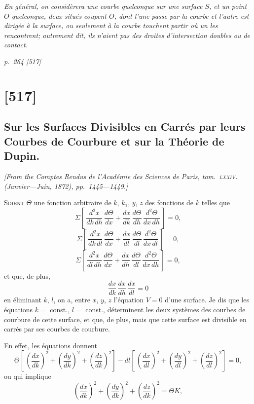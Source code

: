 \documentclass[11pt,a4paper]{article}
\theoremstyle{plain}
\theoremstyle{definition}
\begin{document}
\bigskip
\textit{En g\'en\'eral, on consid\`erera une courbe quelconque sur une surface $S$, et un point $O$ quelconque,
deux situ\'es coupent $O$, dont l'une passe par la courbe et l'autre est dirig\'ee \`a la surface, ou seulement \`a la courbe touchent
partir o\`u un les rencontrent; autrement dit, ils n'aient pas des droites d'intersection doubles ou de contact.}

\clearpage

\bigskip
\textit{p.~264 [517]}
\smallskip

\section{[517]}
\subsection{Sur les Surfaces Divisibles en Carr\'es par leurs Courbes de Courbure et sur la Th\'eorie de Dupin.}

\begin{center}
\textit{[From the \textit{Comptes Rendus de l'Acad\'emie des Sciences de Paris}, tom.~\textsc{lxxiv}. (Janvier---Juin, 1872), pp.~1445---1449.]}
\end{center}

\textsc{Soient} $\Theta$ une fonction arbitraire de $k$, $k_1$, $y$, $z$ des fonctions de $k$ telles que
\[
\Sigma\!\left[\,\frac{d^2x}{dk\,dh}\,\frac{d\Theta}{dx} + \frac{dx}{dk}\,\frac{d\Theta}{dh}\,\frac{d^2\Theta}{dx\,dh}\,\right] = 0,
\]
\[
\Sigma\!\left[\,\frac{d^2x}{dk\,dl}\,\frac{d\Theta}{dx} + \frac{dx}{dl}\,\frac{d\Theta}{dl}\,\frac{d^2\Theta}{dx\,dl}\,\right] = 0,
\]
\[
\Sigma\!\left[\,\frac{d^2x}{dl\,dh}\,\frac{d\Theta}{dx} + \frac{dx}{dh}\,\frac{d\Theta}{dl}\,\frac{d^2\Theta}{dx\,dh}\,\right] = 0,
\]
et que, de plus,
\[
\frac{dx}{dk}\,\frac{dx}{dh}\,\frac{dx}{dl} = 0
\]
en \'eliminant $k$, $l$, on a, entre $x$, $y$, $z$ l'\'equation $V = 0$ d'une surface.  Je dis que les
\'equations $k = $ const., $l = $ const., d\'eterminent les deux syst\`emes des courbes de courbure
de cette surface, et que, de plus, mais que cette surface est divisible en carr\'es par ses courbes
de courbure.

En effet, les \'equations donnent
\[
\Theta\!\left[\,\!\left(\frac{dx}{dk}\right)^2 + \left(\frac{dy}{dk}\right)^2 + \left(\frac{dz}{dk}\right)^2\!\right] - dl\!\left[\,\!\left(\frac{dx}{dl}\right)^2 + \left(\frac{dy}{dl}\right)^2 + \left(\frac{dz}{dl}\right)^2\!\right] = 0,
\]
ou qui implique
\[
\left(\frac{dx}{dk}\right)^2 + \left(\frac{dy}{dk}\right)^2 + \left(\frac{dz}{dk}\right)^2 = \Theta K,
\]
\end{document}
